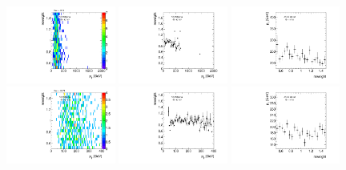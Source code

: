 \begin{figure}[htbp!]
\begin{center}
\includegraphics[width=0.32\textwidth,angle=-90]{figures/boosted/AppendixReweight/Weights/4Trk_Signal_leadHCand_trk0_Pt_weight.pdf}
\includegraphics[width=0.32\textwidth,angle=-90]{figures/boosted/AppendixReweight/Weights/4Trk_Signal_leadHCand_trk0_Pt_weight_profx.pdf}
\includegraphics[width=0.32\textwidth,angle=-90]{figures/boosted/AppendixReweight/Weights/4Trk_Signal_leadHCand_trk0_Pt_weight_profy.pdf}\\
\includegraphics[width=0.32\textwidth,angle=-90]{figures/boosted/AppendixReweight/Weights/4Trk_Signal_sublHCand_trk0_Pt_weight.pdf}
\includegraphics[width=0.32\textwidth,angle=-90]{figures/boosted/AppendixReweight/Weights/4Trk_Signal_sublHCand_trk0_Pt_weight_profx.pdf}
\includegraphics[width=0.32\textwidth,angle=-90]{figures/boosted/AppendixReweight/Weights/4Trk_Signal_sublHCand_trk0_Pt_weight_profy.pdf}\\

\end{center}
\end{figure}
